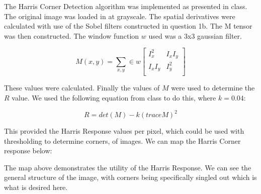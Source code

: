 \documentclass[11pt, oneside]{article}   	%
\begin{document}
The Harris Corner Detection algorithm was implemented as presented in class. The original image was loaded in at grayscale. The spatial derivatives were calculated with use of the Sobel filters constructed in question 1b. The M tensor was then constructed. The window function $w$ used was a 3x3 gaussian filter.

\begin{equation*}
M(x,y) = \sum_{x,y} \in w\begin{bmatrix}
   I^2_x &I_xI_y \\
   I_xI_y & I^2_y\\
\end{bmatrix} 
\end{equation*}

These values were calculated. Finally the values of $M$ were used to determine the $R$ value. We used the following equation from class to do this, where $k = 0.04$:

\begin{equation*}
R = det(M) - k(traceM)^2
\end{equation*}

This provided the Harris Response values per pixel, which could be used with thresholding to determine corners, of images. We can map the Harris Corner response below:

\begin{figure}[H]
  \noindent{}
\end{figure}

The map above demonstrates the utility of the Harris Response. We can see the general structure of the image, with corners being specifically singled out which is what is desired here.
\end{document}
